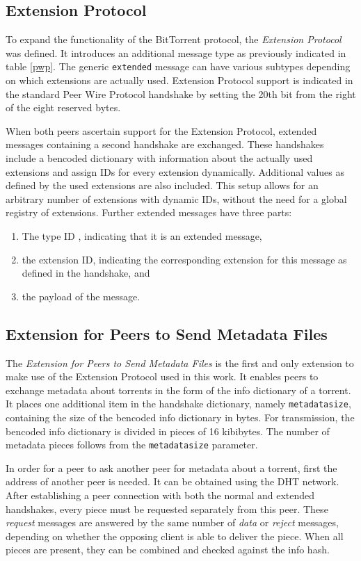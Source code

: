 \documentclass[10pt, a4paper, twoside=false, headsepline]{scrbook}
\renewcommand{\_}{\origunderscore\allowbreak}
\begin{document}
\subsection{Extension Protocol}
\label{ep}
To expand the functionality of the BitTorrent protocol, the \emph{Extension Protocol} \cite{bep10} was defined. It introduces an additional message type as previously indicated in table \ref{pwp}. The generic \texttt{extended} message can have various subtypes depending on which extensions are actually used. Extension Protocol support is indicated in the standard Peer Wire Protocol handshake by setting the 20th bit from the right of the eight reserved bytes.

When both peers ascertain support for the Extension Protocol, extended messages containing a second handshake are exchanged. These handshakes include a bencoded dictionary with information about the actually used extensions and assign IDs for every extension dynamically. Additional values as defined by the used extensions are also included. This setup allows for an arbitrary number of extensions with dynamic IDs, without the need for a global registry of extensions. Further extended messages have three parts:
\begin{enumerate}
  \item The type ID , indicating that it is an extended message,
  \item the extension ID, indicating the corresponding extension for this message as defined in the handshake, and
  \item the payload of the message.
\end{enumerate}

\subsection{Extension for Peers to Send Metadata Files}
\label{ext-meta}
The \emph{Extension for Peers to Send Metadata Files} \cite{bep9} is the first and only extension to make use of the Extension Protocol used in this work. It enables peers to exchange metadata about torrents in the form of the info dictionary of a torrent. It places one additional item in the handshake dictionary, namely \texttt{metadata\_size}, containing the size of the bencoded info dictionary in bytes. For transmission, the bencoded info dictionary is divided in pieces of 16 kibibytes. The number of metadata pieces follows from the \texttt{metadata\_size} parameter.

In order for a peer to ask another peer for metadata about a torrent, first the address of another peer is needed. It can be obtained using the DHT network. After establishing a peer connection with both the normal and extended handshakes, every piece must be requested separately from this peer. These \emph{request} messages are answered by the same number of \emph{data} or \emph{reject} messages, depending on whether the opposing client is able to deliver the piece. When all pieces are present, they can be combined and checked against the info hash.
\end{document}
